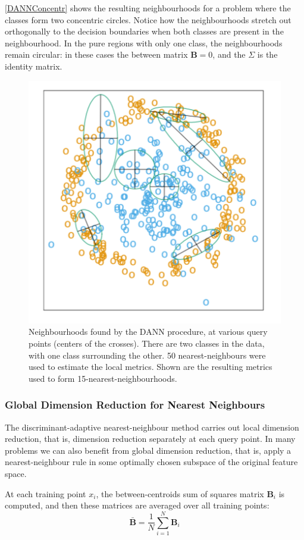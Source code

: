 \documentclass[12pt, letterpaper]{article}
\theoremstyle{definition}
\begin{document}
\autoref{DANNConcentr} shows the resulting neighbourhoods for a problem where the classes form two concentric circles. Notice how the neighbourhoods stretch out orthogonally to the decision boundaries when both classes are present in the neighbourhood. In the pure regions with only one class, the neighbourhoods remain circular: in these cases the between matrix $\mathbf{B} = 0$, and the $\Sigma$ is the identity matrix.
\begin{figure}
\centering
\includegraphics[scale=0.7]{img/DANNConcentr}
\caption{Neighbourhoods found by the DANN procedure, at various query points (centers of the crosses). There are two classes in the data, with one class surrounding the other. 50 nearest-neighbours were used to estimate the local metrics. Shown are the resulting metrics used to form 15-nearest-neighbourhoods.}
\label{DANNConcentr}
\end{figure}

\subsubsection{Global Dimension Reduction for Nearest Neighbours}
The discriminant-adaptive nearest-neighbour method carries out local dimension reduction, that is, dimension reduction separately at each query point. In many problems we can also benefit from global dimension reduction, that is, apply a nearest-neighbour rule in some optimally chosen subspace of the original feature space.

At each training point $x_i$, the between-centroids sum of squares matrix $\mathbf{B}_i$ is computed, and then these matrices are averaged over all training points:
\begin{equation}
\bar{\mathbf{B}} = \frac{1}{N} \sum_{i=1}^N \mathbf{B}_i
\end{equation}
\end{document}
